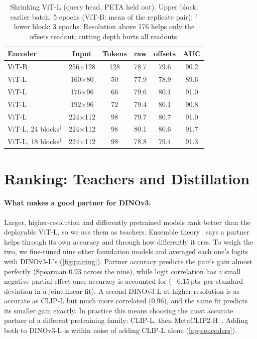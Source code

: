 \documentclass[10pt,twocolumn,letterpaper]{article}
\newcommand{\pts}{\,pts}
\begin{document}
\begin{table}[t]
\centering\small
\setlength{\tabcolsep}{3pt}
\begin{tabular}{@{}lccccc@{}}
\toprule
Encoder & Input & Tokens & raw & offsets & AUC \\
\midrule
ViT-B & 256$\times$128 & 128 & 78.7 & 79.6 & 90.2 \\
ViT-L & 160$\times$80 & 50 & 77.9 & 78.9 & 89.6 \\
ViT-L & 176$\times$96 & 66 & 79.6 & 80.1 & 91.0 \\
ViT-L & 192$\times$96 & 72 & 79.4 & 80.1 & 90.8 \\
ViT-L & 224$\times$112 & 98 & 79.7 & 80.7 & 91.0 \\
\midrule
ViT-L, 24 blocks$^\dagger$ & 224$\times$112 & 98 & 80.1 & 80.6 & 91.7 \\
ViT-L, 18 blocks$^\dagger$ & 224$\times$112 & 98 & 78.8 & 79.4 & 91.3 \\
\bottomrule
\end{tabular}
\caption{Shrinking ViT-L (query head, PETA held out). Upper block: earlier batch, 5 epochs (ViT-B: mean of the replicate pair); $^\dagger$lower block: 3 epochs. Resolution above 176 helps only the offsets readout; cutting depth hurts all readouts.}
\label{tab:res}
\end{table}

\section{Ranking: Teachers and Distillation}
\label{sec:teachers}

\paragraph{What makes a good partner for DINOv3.} Larger, higher-resolution and differently pretrained models rank better than the deployable ViT-L, so we use them as teachers. Ensemble theory~\cite{krogh} says a partner helps through its own accuracy and through how differently it errs. To weigh the two, we fine-tuned nine other foundation models and averaged each one's logits with DINOv3-L's (\cref{fig:pairing}). Partner accuracy predicts the pair's gain almost perfectly (Spearman 0.93 across the nine), while logit correlation has a small negative partial effect once accuracy is accounted for ($-$0.15\pts\ per standard deviation in a joint linear fit). A second DINOv3-L at higher resolution is as accurate as CLIP-L but much more correlated (0.96), and the same fit predicts its smaller gain exactly. In practice this means choosing the most accurate partner of a different pretraining family: CLIP-L, then MetaCLIP2-H~\cite{metaclip2}. Adding both to DINOv3-L is within noise of adding CLIP-L alone (\cref{app:encoders}).
\end{document}

